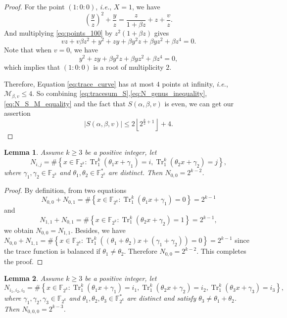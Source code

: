 \documentclass{article}
\newcommand{\F}{\mathbb{F}}
\newcommand{\0}{\textbf{0}}
\newcommand{\1}{\textbf{1}}
\newcommand{\TRACE}{\operatorname{Tr}_1^k}
\theoremstyle{plain}
\newtheorem{lemma}{Lemma}
\begin{document}
\begin{proof}
        For the point $(1 : 0 : 0)$, \emph{i.e.}, $X = 1$, we have
        \begin{equation}\label{eq:points_100}
            \left( \frac{y}{z} \right)^2+\frac{y}{z}=\frac{z}{1+\beta z}+z+\frac{v}{z}.
        \end{equation}
        And multiplying \eqref{eq:points_100} by $z^2(1+\beta z)$ gives
        \[vz+v\beta z^2+y^2+zy+\beta y^2z+\beta yz^2+\beta z^4=0.\]
        Note that when $v=0$, we have
        \[y^2+zy+\beta y^2z+\beta yz^2+\beta z^4=0,\]
        which implies that $(1:0:0)$ is a root of multiplicity $2$.

        Therefore, Equation \eqref{eq:trace_curve} has at most $4$ points at infinity, \emph{i.e.}, 
        $\mathcal{M}_{\beta,v}\le 4$.
        So combining \eqref{eq:tracesum_S},\eqref{eq:N_genus_inequality},\eqref{eq:N_S_M_equality} and the fact that
        $S(\alpha,\beta,v)$ is even, we can get our assertion
        \[\left\lvert S(\alpha,\beta,v)\right\rvert \le 2\left\lfloor 2^{\frac{k}{2}+1}\right\rfloor+4.\]
    \end{proof}

    \begin{lemma}\label{lemma:N_ij_trace}
        Assume  $k\ge 3$ be a positive integer, let
        \[ N_{i,j} =\#\left\{x\in\F_{2^k} : \TRACE\left(\theta_1x+\gamma_1\right)=i,\TRACE\left(\theta_2x+\gamma_2\right)=j\right\}, \]
        where  $\gamma_1,\gamma_2\in\F_{2^k}$ and $\theta_1,\theta_2\in\F_{2^k}^*$ are distinct. Then $N_{0,0} =2^{k-2}$.
    \end{lemma}

   \begin{proof}
        By definition, from two equations
        \[N_{0,0}+N_{0,1}=\#\left\{x\in\F_{2^k} : \TRACE\left(\theta_1x+\gamma_1\right)=0\right\}=2^{k-1}\]
        and
        \[N_{1,1}+N_{0,1}=\#\left\{x\in\F_{2^k} : \TRACE\left(\theta_2x+\gamma_2\right)=1\right\}=2^{k-1},\]
        we obtain $N_{0,0} = N_{1,1}$.
        Besides, we have $N_{0,0}+N_{1,1} = \#\left\{x\in\F_{2^k} : \TRACE\left((\theta_1+\theta_2)x+(\gamma_1+\gamma_2)\right)=0\right\}=2^{k-1}$
        since the trace function is balanced if $\theta_1\ne\theta_2$.
        Therefore $N_{0,0}=2^{k-2}$. This completes the proof.
   \end{proof}

    \begin{lemma}\label{lemma:N_ijk_trace}
        Assume $k\ge 3$ be a positive integer, let
        \[ N_{i_1,i_2,i_3}=\#\left\{x\in\F_{2^k} :  \TRACE\left(\theta_1x+\gamma_1\right)=i_1,\TRACE\left(\theta_2x+\gamma_2\right)=i_2,\TRACE\left(\theta_3x+\gamma_3\right)=i_3 \right\},\]
        where  $\gamma_1,\gamma_2,\gamma_3\in\F_{2^k}$ and $\theta_1,\theta_2,\theta_3\in\F_{2^k}^*$ are distinct and satisfy
        $\theta_3\ne\theta_1+\theta_2$. Then $N_{0,0,0}= 2^{k-3}$.
    \end{lemma}
\end{document}
